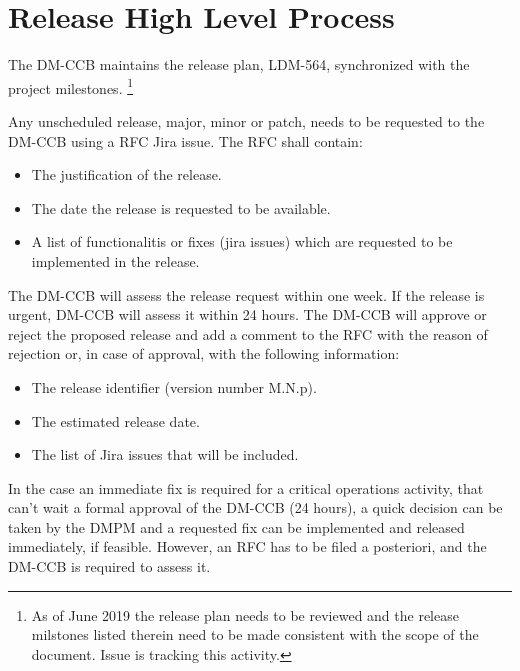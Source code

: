 \section{Release High Level Process} \label{sec:process}

The DM-CCB maintains the release plan, LDM-564, synchronized with the project milestones.
\footnote{As of June 2019 the release plan needs to be reviewed and the release milstones listed therein need to be made consistent with the scope of the document.
Issue  is tracking this activity.}

Any unscheduled release, major, minor or patch, needs to be requested to the DM-CCB using a RFC Jira issue.
The RFC shall contain:

\begin{itemize}
\item The justification of the release.
\item The date the release is requested to be available.
\item A list of functionalitis or fixes (jira issues) which are requested to be implemented in the release.
\end{itemize}

The DM-CCB  will assess the release request within one week. 
If the release is urgent, DM-CCB will assess it  within 24 hours.
The DM-CCB will approve or reject the proposed release and add a comment to the RFC with the reason of rejection or, in case of approval, with the following information:

\begin{itemize}
\item The release identifier (version number M.N.p).
\item The estimated release date.
\item The list of Jira issues that will be included.
\end{itemize}

In the case an immediate fix is required for a critical operations activity, that can't wait a formal approval of the DM-CCB (24 hours),
a quick decision can be taken by the \gls{DMPM} and a requested fix can be implemented and released immediately, if feasible.
However, an \gls{RFC} has to be filed a posteriori, and the DM-CCB is required to assess it.

